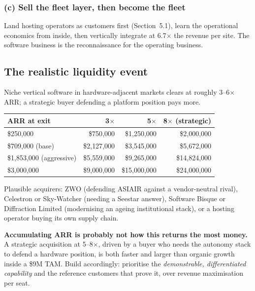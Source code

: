 \documentclass[11pt]{article}
\newcommand{\dollar}[1]{\$#1}
\begin{document}
\subsubsection*{(c) Sell the fleet layer, then become the fleet}

Land hosting operators as customers first (Section~5.1), learn the operational
economics from inside, then vertically integrate at 6.7$\times$ the revenue per
site. The software business is the reconnaissance for the operating business.

\subsection{The realistic liquidity event}

Niche vertical software in hardware-adjacent markets clears at roughly
3--6$\times$ ARR; a strategic buyer defending a platform position pays more.

\begin{center}
\small
\begin{tabular}{@{}lrrr@{}}
\toprule
\textbf{ARR at exit} & \textbf{3$\times$} & \textbf{5$\times$} & \textbf{8$\times$ (strategic)} \\
\midrule
\dollar{250{,}000} & \dollar{750{,}000} & \dollar{1{,}250{,}000} & \dollar{2{,}000{,}000} \\
\dollar{709{,}000} (base) & \dollar{2{,}127{,}000} & \dollar{3{,}545{,}000} & \dollar{5{,}672{,}000} \\
\dollar{1{,}853{,}000} (aggressive) & \dollar{5{,}559{,}000} & \dollar{9{,}265{,}000} & \dollar{14{,}824{,}000} \\
\dollar{3{,}000{,}000} & \dollar{9{,}000{,}000} & \dollar{15{,}000{,}000} & \dollar{24{,}000{,}000} \\
\bottomrule
\end{tabular}
\end{center}

\vspace{0.3em}
Plausible acquirers: ZWO (defending ASIAIR against a vendor-neutral rival),
Celestron or Sky-Watcher (needing a Seestar answer), Software Bisque or
Diffraction Limited (modernising an ageing institutional stack), or a hosting
operator buying its own supply chain.

\begin{warnbox}
\textbf{Accumulating ARR is probably not how this returns the most money.} A
strategic acquisition at 5--8$\times$, driven by a buyer who needs the autonomy
stack to defend a hardware position, is both faster and larger than organic
growth inside a \dollar{9}M TAM. Build accordingly: prioritise the
\emph{demonstrable, differentiated capability} and the reference customers that
prove it, over revenue maximisation per seat.
\end{warnbox}
\end{document}
